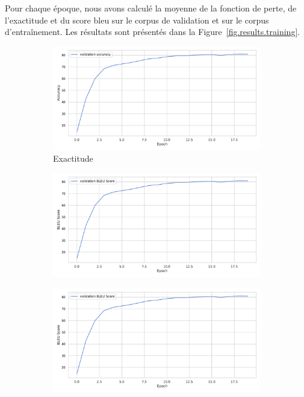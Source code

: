 Pour chaque époque, nous avons calculé la moyenne de la fonction de perte, de l'exactitude et du score \gls{bleu} 
sur le corpus de validation et sur le corpus d'entraînement.
Les résultats sont présentés dans la Figure~\ref{fig.results.training}.
\begin{figure}[hbt]
    \begin{subfigure}{.5\textwidth}
        \begin{center}
            \includegraphics[width=\textwidth]{assets/python/accuracy.pdf}
        \end{center}
        \caption{Exactitude}
        \label{fig.results.training.accuracy}
    \end{subfigure}
    \begin{subfigure}{.5\textwidth}
        \begin{center}
            \includegraphics[width=\textwidth]{assets/python/bleu.pdf}
        \end{center}
        \caption{}
        \label{fig.results.training.bleu}
    \end{subfigure}
    \begin{subfigure}{.5\textwidth}
        \begin{center}
            \includegraphics[width=\textwidth]{assets/python/bleu.pdf}

\end{center}
\end{subfigure}
\end{figure}
